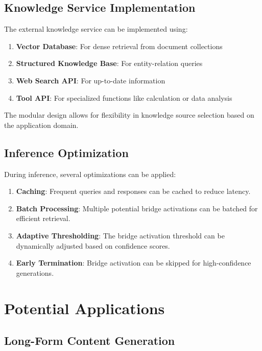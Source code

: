 \documentclass[9pt,a4paper,twocolumn,twoside]{tau-class/tau}
\begin{document}
\subsection{Knowledge Service Implementation}

    The external knowledge service can be implemented using:

    \begin{enumerate}
        \item \textbf{Vector Database}: For dense retrieval from document collections
        \item \textbf{Structured Knowledge Base}: For entity-relation queries
        \item \textbf{Web Search API}: For up-to-date information
        \item \textbf{Tool API}: For specialized functions like calculation or data analysis
    \end{enumerate}

    The modular design allows for flexibility in knowledge source selection based on the application domain.

\subsection{Inference Optimization}

    During inference, several optimizations can be applied:

    \begin{enumerate}
        \item \textbf{Caching}: Frequent queries and responses can be cached to reduce latency.
        \item \textbf{Batch Processing}: Multiple potential bridge activations can be batched for efficient retrieval.
        \item \textbf{Adaptive Thresholding}: The bridge activation threshold can be dynamically adjusted based on confidence scores.
        \item \textbf{Early Termination}: Bridge activation can be skipped for high-confidence generations.
    \end{enumerate}

\section{Potential Applications}

\subsection{Long-Form Content Generation}
\end{document}
